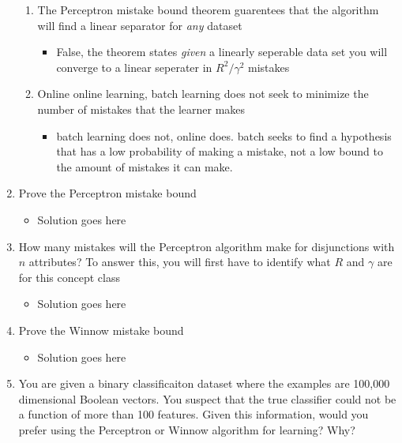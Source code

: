 \documentclass{article}
\begin{document}
\begin{enumerate}
\begin{enumerate}
	\item The Perceptron mistake bound theorem guarentees that the algorithm will find a linear separator for {\em any} dataset
		\begin{itemize}
		\item False, the theorem states \textit{given} a linearly seperable data set you will converge to a linear seperater in $R^2/\gamma^2$ mistakes
		\end{itemize}

	\item Online online learning, batch learning does not seek to minimize the number of mistakes that the learner makes
		\begin{itemize}
		\item batch learning does not, online does. batch seeks to find a hypothesis that has a low probability of making a mistake, not a low bound to the amount of mistakes it can make.
		\end{itemize}

	\end{enumerate}

\item Prove the Perceptron mistake bound

	\begin{itemize}
	\item Solution goes here
	\end{itemize}


\item How many mistakes will the Perceptron algorithm make for disjunctions with $n$ attributes? To answer this, you will first have to identify what $R$ and $\gamma$ are for this concept class

	\begin{itemize}
	\item Solution goes here
	\end{itemize}



\item Prove the Winnow mistake bound


	\begin{itemize}
	\item Solution goes here
	\end{itemize}



\item You are given a binary classificaiton dataset where the examples are 100,000 dimensional Boolean vectors. You suspect that the true classifier could not be a function of more than 100 features. Given this information, would you prefer using the Perceptron or Winnow algorithm for learning? Why?



\end{enumerate}
\end{document}
